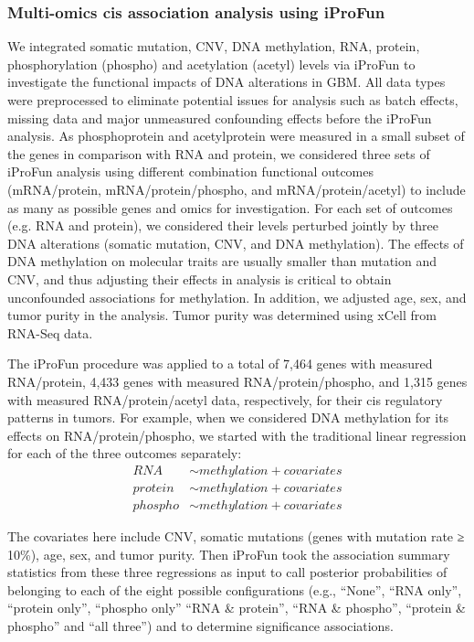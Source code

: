 \subsubsection{Multi-omics cis association analysis using iProFun}
We integrated somatic mutation, CNV, DNA methylation, RNA, protein, phosphorylation (phospho) and acetylation (acetyl) levels via iProFun \cite{songx_wangp:InsightsImpact2019} to investigate the functional impacts of DNA alterations in GBM. All data types were preprocessed to eliminate potential issues for analysis such as batch effects, missing data and major unmeasured confounding effects before the iProFun analysis. As phosphoprotein and acetylprotein were measured in a small subset of the genes in comparison with RNA and protein, we considered three sets of iProFun analysis using different combination functional outcomes (mRNA/protein, mRNA/protein/phospho, and mRNA/protein/acetyl) to include as many as possible genes and omics for investigation. For each set of outcomes (e.g. RNA and protein), we considered their levels perturbed jointly by three DNA alterations (somatic mutation, CNV, and DNA methylation). The effects of DNA methylation on molecular traits are usually smaller than mutation and CNV, and thus adjusting their effects in analysis is critical to obtain unconfounded associations for methylation. In addition, we adjusted age, sex, and tumor purity in the analysis. Tumor purity was determined using xCell \cite{arand_butteaj:XCellDigitally2017} from RNA-Seq data.

The iProFun procedure was applied to a total of 7,464 genes with measured RNA/protein, 4,433 genes with measured RNA/protein/phospho, and 1,315 genes with measured RNA/protein/acetyl data, respectively, for their cis regulatory patterns in tumors. For example, when we considered DNA methylation for its effects on RNA/protein/phospho, we started with the traditional linear regression for each of the three outcomes separately:
\begin{align*}
    \mathit{RNA} & \sim \mathit{methylation} + \mathit{covariates} \\
    \mathit{protein} & \sim \mathit{methylation} + \mathit{covariates} \\
    \mathit{phospho} & \sim \mathit{methylation} + \mathit{covariates}
\end{align*}

The covariates here include CNV, somatic mutations (genes with mutation rate ≥ 10\%), age, sex, and tumor purity. Then iProFun took the association summary statistics from these three regressions as input to call posterior probabilities of belonging to each of the eight possible configurations (e.g., ``None'', ``RNA only'', ``protein only'', ``phospho only'' ``RNA \& protein'', ``RNA \& phospho'', ``protein \& phospho'' and ``all three'') and to determine significance associations.

